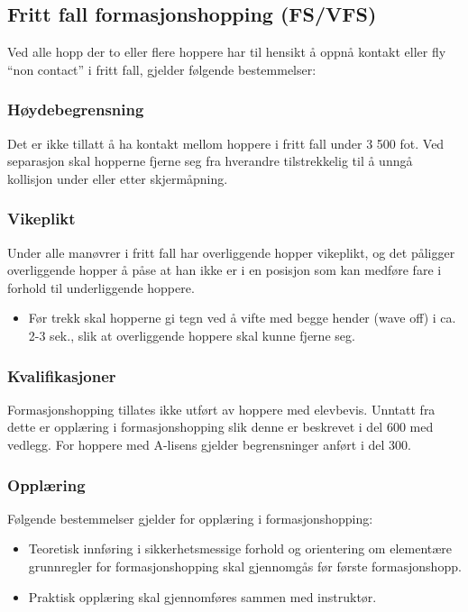 \subsection{Fritt fall formasjonshopping (FS/VFS)}
Ved alle hopp der to eller flere hoppere har til hensikt å oppnå kontakt eller fly ``non contact'' i fritt fall, gjelder følgende bestemmelser:

\subsubsection{Høydebegrensning}
Det er ikke tillatt å ha kontakt mellom hoppere i fritt fall under 3 500 fot. Ved separasjon skal hopperne fjerne seg fra hverandre tilstrekkelig til å unngå kollisjon under eller etter skjermåpning.

\subsubsection{Vikeplikt}
Under alle manøvrer i fritt fall har overliggende hopper vikeplikt, og det påligger overliggende hopper å påse at han ikke er i en posisjon som kan medføre fare i forhold til underliggende hoppere.
\begin{itemize}
	\item Før trekk skal hopperne gi tegn ved å vifte med begge hender (wave off) i ca. 2-3 sek., slik at overliggende hoppere skal kunne fjerne seg.
\end{itemize}

\subsubsection{Kvalifikasjoner}
Formasjonshopping tillates ikke utført av hoppere med elevbevis. Unntatt fra dette er opplæring i formasjonshopping slik denne er beskrevet i del 600 med vedlegg. For hoppere med A-lisens gjelder begrensninger anført i del 300.

\subsubsection{Opplæring}
Følgende bestemmelser gjelder for opplæring i formasjonshopping:
\begin{itemize}
	\item Teoretisk innføring i sikkerhetsmessige forhold og orientering om elementære grunnregler for formasjonshopping skal gjennomgås før første formasjonshopp.
	\item Praktisk opplæring skal gjennomføres sammen med instruktør.
\end{itemize}

